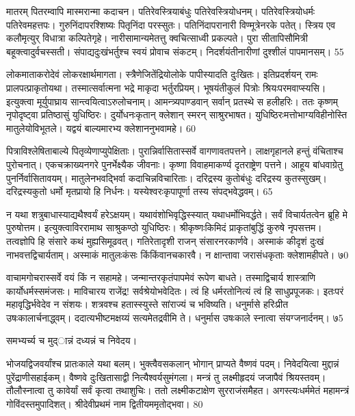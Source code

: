   मातरम् पितरम्वापि मास्मरान्मा कदाचन।
 पतिरेवस्त्रियाबंधुः पतिरेवस्त्रियोधनम्।
 पतिरेवस्त्रियोधर्मः पतिरेवमहत्तपः।
 गुरुनिंदापरश्शिष्यः पितृनिंदा परस्सुतः।
 पतिनिंदापरानारी विण्मूत्रेनरके पतेत्।
 स्त्रिय एव कलौमृत्युर् विधात्रा कल्पितेगृहे।
 नारीसामान्यमेतत्तु क्वचित्साध्वी प्रकल्पते।
 पुरा सीतापिसौमित्री बहूक्त्वादुर्वचस्सती।
 संपाद्यदुःखंभर्तुश्च स्वयं प्रोवाच संकटम्।
 निदर्शयंतीनारीणां दुश्शीलं पापमानसम्।
 55

 
लोकमाताकरोदेवं लोकरक्षार्थमागता।
 स्त्रैणेजितेंद्रियोलोके पापीस्यादति दुःखितः।
 इतिप्रदर्शयन् रामः प्रालपत्प्राकृतोयथा।
 तस्मात्सर्वात्मना भद्रे माकृदा भर्तुरप्रियम्।
 भूषयंतीकुलं पित्रोः श्रियःपरमवाप्स्यसि।
 इत्युक्त्वा मूर्युपाघ्राय सान्त्वयित्वाऽरुलोचनाम्।
 आमन्त्र्यपाण्डवान् सर्वान् प्रतस्थे स हलीहरिः।
 ततः कृष्णम् नृपोदृष्ट्वा प्रतिष्ठासुं युधिष्ठिरः।
 दुर्योधनःकृतान् क्लेशान् स्मरन् साश्रुरभाषत।
 युधिष्ठिरःमत्तोभाग्यविहीनोस्ति मातुलेयोविभूतले।
 यद्वयं बाल्यमारभ्य क्लेशाननुभवामहे।
 60

  पित्राविश्लेषिताबाल्ये पितृव्येणाप्युपेक्षिताः।
 पुरान्निर्वासितास्सर्वे वागणावतपत्तने।
 लाक्षगृहानले हन्तुं वंचिताश्च पुरोचनात्।
 एकचक्राख्यनगरे पुनर्भेक्ष्यैक जीवनाः।
 कृष्णा विवाहमाकर्ण्य दृतराष्ट्रेण पत्तने।
 आहूय बांधवाग्रेतु पुनर्निर्वासितावयम्।
 मातुलेनभवद्भिर्वा कदाचिन्नविचारिताः।
 दरिद्रस्य कुतोबंधुः दरिद्रस्य कुतस्सुखम्।
 दरिद्रस्यकुतो धर्मो मृतप्रायो हि निर्धनः।
 यस्येश्वरःकृपापूर्णा तस्य संपद्भवेद्धवम्।
 65

 
न यथा शत्रुबाधास्याद्यथैश्वर्यं हरेऽक्षयम्।
 यथावंशोभिवृद्धिस्स्यात् यथाधर्मोभिवर्द्धते।
 सर्वं विचार्यतत्वेन ब्रूहि मे पुरुषोत्तम।
 इत्युक्त्वाविररामाथ साश्रुकण्ठो युधिष्ठिरः।
 श्रीकृष्णःकिमिदं प्राकृतांबुद्धिं कुरुषे नृपसत्तम।
 तत्वज्ञोपि हि संसारे कथं मुह्यसिमूढवत्।
 गतिरेतादृशी राजन् संसारनरकार्णवे।
 अस्माकं कीदृशं दुःखं नाभवत्तद्विचार्यताम्।
 अस्माकं मातुलःकंसः किंकिंवानचकारवै।
 न क्षान्तावा जरासंधकृताः क्लेशामहीपते।
 ७0

  वाचामगोचरास्सर्वे वयं किं न सहामहे।
 जन्मान्तरकृतंपापमेवं रूपेण बाधते।
 तस्माद्विचार्य शास्त्राणि कार्योधर्मस्समंजसः।
 माविचारय राजेंद्र! सर्वश्रेयोभवेदितः।
 त्वं हि धर्मरतोनित्यं त्वं हि साधुप्रपूजकः।
 इतःपरं महावृद्धिर्भवेदेव न संशयः।
 शत्रवश्च हतास्स्युस्ते सांराज्यं च भविष्यति।
 धनुर्मासे हरिःप्रीत उषःकालार्चनाद्ध्वम्।
 ददात्यभीष्टमक्षय्यं सत्यमेतद्रवीमि ते।
 धनुर्मास उषःकाले स्नात्वा संयग्जनार्दनम्।
 ७5

  समभ्यर्च्य च मुद्ान्नं दध्यन्नं च निवेदय।

भोजयद्विजवर्यांश्च प्रातःकाले यथा बलम्।
 भुक्त्वैवसकलान् भोगान् प्राप्यते वैष्णवं पदम्।
 निवेदयित्वा मुद्दान्नं पुरेंद्राणीसहाईकम्।
 वैष्णवे दुःखितासाद्वी नित्यैश्वर्यसुमंगला।
 मन्त्रं तु लक्ष्मीहृदयं जजापैवं श्रियस्तवम्।
 तौलौस्नात्वा तु कावेर्यां सर्वं कृत्वा तथाशुचिः।
 ततो लक्ष्मीकटाक्षेण सुरराजंसमैहत।
 अगस्त्यःधर्ममेतं महामन्त्रं गोविंदस्तमुपादिशत्।
 श्रीदेवीप्रथमं नाम द्वितीयममृतोद्भवा।
 80

